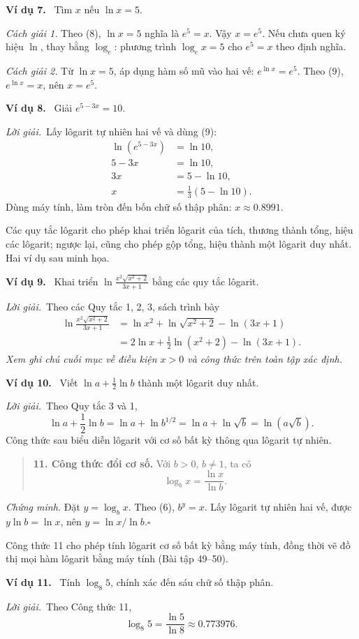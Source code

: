 \documentclass[12pt,a4paper]{article}
\newcommand{\ex}[1]{\par\medskip\noindent\textbf{Ví dụ #1.}\ }
\newcommand{\sol}{\par\noindent\textit{Lời giải.}\ }
\begin{document}
\ex{7} Tìm $x$ nếu $\ln x=5$.
\par\noindent\textit{Cách giải 1.} Theo (8), $\ln x=5$ nghĩa là $e^5=x$. Vậy $x=e^5$. Nếu chưa quen ký hiệu $\ln$, thay bằng $\log_e$: phương trình $\log_e x=5$ cho $e^5=x$ theo định nghĩa.
\par\noindent\textit{Cách giải 2.} Từ $\ln x=5$, áp dụng hàm số mũ vào hai vế: $e^{\ln x}=e^5$. Theo (9), $e^{\ln x}=x$, nên $x=e^5$.

\ex{8} Giải $e^{5-3x}=10$.
\sol Lấy lôgarit tự nhiên hai vế và dùng (9):
\begin{align*}
\ln(e^{5-3x})&=\ln10,\\
5-3x&=\ln10,\\
3x&=5-\ln10,\\
x&=\frac13(5-\ln10).
\end{align*}
Dùng máy tính, làm tròn đến bốn chữ số thập phân: $x\approx0.8991$.

Các quy tắc lôgarit cho phép khai triển lôgarit của tích, thương thành tổng, hiệu các lôgarit; ngược lại, cũng cho phép gộp tổng, hiệu thành một lôgarit duy nhất. Hai ví dụ sau minh họa.

\ex{9} Khai triển $\displaystyle\ln\frac{x^2\sqrt{x^2+2}}{3x+1}$ bằng các quy tắc lôgarit.
\sol Theo các Quy tắc 1, 2, 3, sách trình bày
\begin{align*}
\ln\frac{x^2\sqrt{x^2+2}}{3x+1}
&=\ln x^2+\ln\sqrt{x^2+2}-\ln(3x+1)\\
&=2\ln x+\frac12\ln(x^2+2)-\ln(3x+1).
\end{align*}
\noindent\textit{Xem ghi chú cuối mục về điều kiện $x>0$ và công thức trên toàn tập xác định.}

\ex{10} Viết $\ln a+\frac12\ln b$ thành một lôgarit duy nhất.
\sol Theo Quy tắc 3 và 1,
\[\ln a+\frac12\ln b=\ln a+\ln b^{1/2}=\ln a+\ln\sqrt b=\ln(a\sqrt b).\]
Công thức sau biểu diễn lôgarit với cơ số bất kỳ thông qua lôgarit tự nhiên.
\begin{quote}\textbf{11. Công thức đổi cơ số.} Với $b>0$, $b\ne1$, ta có
\[\log_bx=\frac{\ln x}{\ln b}.\]
\end{quote}
\noindent\textit{Chứng minh.} Đặt $y=\log_bx$. Theo (6), $b^y=x$. Lấy lôgarit tự nhiên hai vế, được $y\ln b=\ln x$, nên $y=\ln x/\ln b$.\hfill$\square$

Công thức 11 cho phép tính lôgarit cơ số bất kỳ bằng máy tính, đồng thời vẽ đồ thị mọi hàm lôgarit bằng máy tính (Bài tập 49–50).

\ex{11} Tính $\log_8 5$, chính xác đến sáu chữ số thập phân.
\sol Theo Công thức 11,
\[\log_8 5=\frac{\ln5}{\ln8}\approx0.773976.\]
\end{document}
